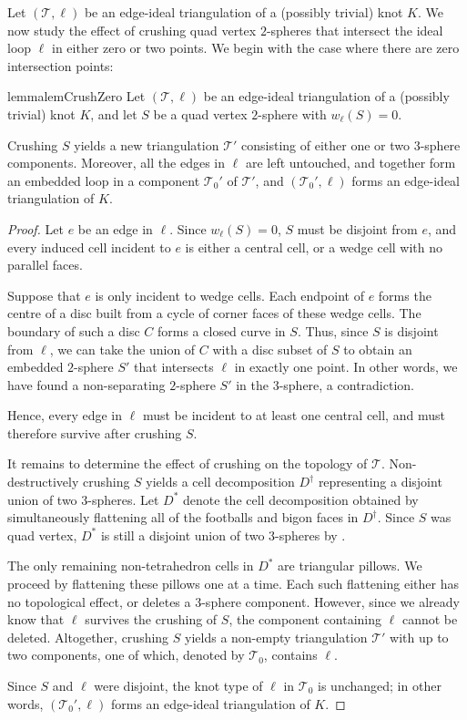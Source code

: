 \documentclass[a4paper,UKenglish,cleveref, autoref, thm-restate]{lipics-v2021}
\newcommand{\tri}{\mathcal{T}}
\begin{document}
Let $(\tri,\ell)$ be an edge-ideal triangulation of a (possibly trivial) knot $K$.
We now study the effect of crushing quad vertex $2$-spheres that intersect the ideal loop $\ell$ in either zero or two points.
We begin with the case where there are zero intersection points:

\begin{restatable}{lemma}{lemCrushZero}\label{lem:crushW=0}
Let $(\tri,\ell)$ be an edge-ideal triangulation of a (possibly trivial) knot $K$, and let $S$ be a quad vertex $2$-sphere with $w_\ell(S)=0$.

Crushing $S$ yields a new triangulation $\tri'$ consisting of either one or two $3$-sphere components. Moreover, all the edges in $\ell$ are left untouched, and together form an embedded loop in a component $\tri_0'$ of $\tri'$, and $(\tri_0',\ell)$ forms an edge-ideal triangulation of $K$.
\end{restatable}

\begin{proof}
Let $e$ be an edge in $\ell$.
Since $w_\ell(S)=0$, $S$ must be disjoint from $e$, and every induced cell incident to $e$ is either a central cell, or a wedge cell with no parallel faces.

Suppose that $e$ is only incident to wedge cells.
Each endpoint of $e$ forms the centre of a disc built from a cycle of corner faces of these wedge cells.
The boundary of such a disc $C$ forms a closed curve in $S$.
Thus, since $S$ is disjoint from $\ell$, we can take the union of $C$ with a disc subset of $S$
to obtain an embedded $2$-sphere $S'$ that intersects $\ell$ in exactly one point.
In other words, we have found a non-separating $2$-sphere $S'$ in the $3$-sphere, a contradiction.

Hence, every edge in $\ell$ must be incident to at least one central cell, and must therefore survive after crushing $S$.

It remains to determine the effect of crushing on the topology of $\tri$.
Non-destructively crushing $S$ yields a cell decomposition $D^\dagger$ representing a disjoint union of two $3$-spheres.
Let $D^\ast$ denote the cell decomposition obtained by simultaneously flattening all of the footballs and bigon faces in $D^\dagger$.
Since $S$ was quad vertex, $D^\ast$ is still a disjoint union of two $3$-spheres by .

The only remaining non-tetrahedron cells in $D^\ast$ are triangular pillows.
We proceed by flattening these pillows one at a time.
Each such flattening either has no topological effect, or deletes a $3$-sphere component.
However, since we already know that $\ell$ survives the crushing of $S$, the component containing $\ell$ cannot be deleted. Altogether, crushing $S$ yields a non-empty triangulation $\tri'$ with up to two components, one of which, denoted by $\tri_0$, contains $\ell$.

Since $S$ and $\ell$ were disjoint, the knot type of $\ell$ in $\tri_0$ is unchanged;
in other words, $(\tri_0',\ell)$ forms an edge-ideal triangulation of $K$.
\end{proof}
\end{document}
